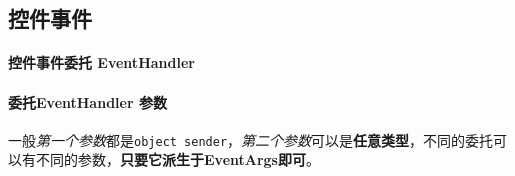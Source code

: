 \documentclass[UTF8,a4paper,12pt]{ctexbook}
\begin{document}
		\subsection{控件事件}
			\paragraph{控件事件委托 EventHandler}
			
			\paragraph{委托EventHandler 参数}
				
				一般\textit{第一个参数}都是\verb|object sender|，\textit{第二个参数}可以是\textbf{任意类型}，不同的委托可以有不同的参数，\textbf{只要它派生于EventArgs即可}。
			
\end{document}
